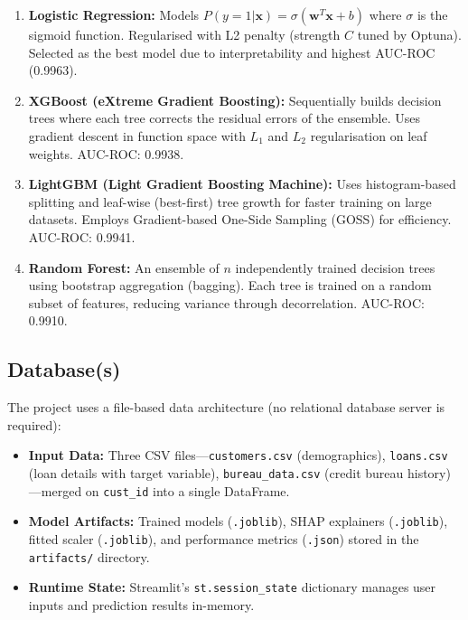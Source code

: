 \documentclass[12pt,a4paper]{report}
\begin{document}
\begin{enumerate}
    \item \textbf{Logistic Regression:} Models $P(y=1|\mathbf{x}) = \sigma(\mathbf{w}^T\mathbf{x} + b)$ where $\sigma$ is the sigmoid function. Regularised with L2 penalty (strength $C$ tuned by Optuna). Selected as the best model due to interpretability and highest AUC-ROC (0.9963).

    \item \textbf{XGBoost (eXtreme Gradient Boosting):} Sequentially builds decision trees where each tree corrects the residual errors of the ensemble. Uses gradient descent in function space with $L_1$ and $L_2$ regularisation on leaf weights. AUC-ROC: 0.9938.

    \item \textbf{LightGBM (Light Gradient Boosting Machine):} Uses histogram-based splitting and leaf-wise (best-first) tree growth for faster training on large datasets. Employs Gradient-based One-Side Sampling (GOSS) for efficiency. AUC-ROC: 0.9941.

    \item \textbf{Random Forest:} An ensemble of $n$ independently trained decision trees using bootstrap aggregation (bagging). Each tree is trained on a random subset of features, reducing variance through decorrelation. AUC-ROC: 0.9910.
\end{enumerate}

\subsection{Database(s)}

The project uses a file-based data architecture (no relational database server is required):

\begin{itemize}
    \item \textbf{Input Data:} Three CSV files---\texttt{customers.csv} (demographics), \texttt{loans.csv} (loan details with target variable), \texttt{bureau\_data.csv} (credit bureau history)---merged on \texttt{cust\_id} into a single DataFrame.
    \item \textbf{Model Artifacts:} Trained models (\texttt{.joblib}), SHAP explainers (\texttt{.joblib}), fitted scaler (\texttt{.joblib}), and performance metrics (\texttt{.json}) stored in the \texttt{artifacts/} directory.
    \item \textbf{Runtime State:} Streamlit's \texttt{st.session\_state} dictionary manages user inputs and prediction results in-memory.
\end{itemize}
\end{document}
